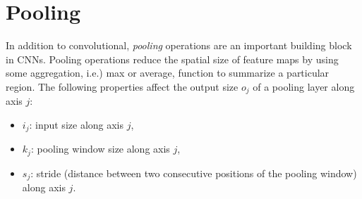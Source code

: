 \section{Pooling}\label{sec:pooling}

In addition to convolutional, {\em pooling\/} operations
are an important building block in CNNs. Pooling operations reduce the spatial size of feature maps by using some aggregation, i.e.) max or average, function to summarize a particular region.
The following properties affect the output size $o_j$ of a pooling layer
along axis $j$:

\begin{itemize}
    \item $i_j$: input size along axis $j$,
    \item $k_j$: pooling window size along axis $j$,
    \item $s_j$: stride (distance between two consecutive positions of the
        pooling window) along axis $j$.
\end{itemize}
